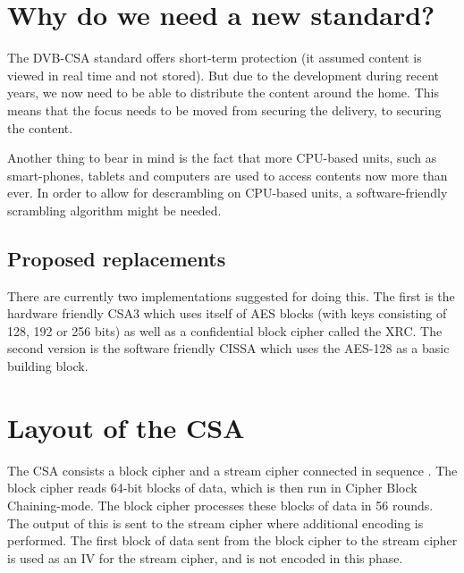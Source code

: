 \section{Why do we need a new standard?}
The DVB-CSA standard offers short-term protection (it assumed content is viewed 
in real time and not stored). But due to the development during recent years, 
we now need to be able to distribute the content around the home. This means 
that the focus needs to be moved from securing the delivery, to securing the 
content. \citep{Farncombe}

Another thing to bear in mind is the fact that more CPU-based units, such as 
smart-phones, tablets and computers are used to access contents now more than 
ever. In order to allow for descrambling on CPU-based units, a software-friendly 
scrambling algorithm might be needed.

\subsection{Proposed replacements}
There are currently two implementations suggested for doing this. The first is 
the hardware friendly CSA3 which uses itself of AES blocks (with keys consisting 
of 128, 192 or 256 bits) as well as a confidential block cipher called the XRC. 
The second version is the software friendly CISSA which uses the AES-128 as a 
basic building block. \citep{DVB:2013}


\section{Layout of the CSA}
The CSA consists a block cipher and a stream cipher connected in sequence 
\citep[p. 271]{WeiLi:2007}. The block cipher reads 64-bit blocks of data, which 
is then run in Cipher Block Chaining-mode. The block cipher processes these 
blocks of data in 56 rounds. The output of this is sent to the stream cipher 
where additional encoding is performed. The first block of data sent from the 
block cipher to the stream cipher is used as an IV for the stream cipher, and is 
not encoded in this phase. \citep{DVBAnalysis:2006}

